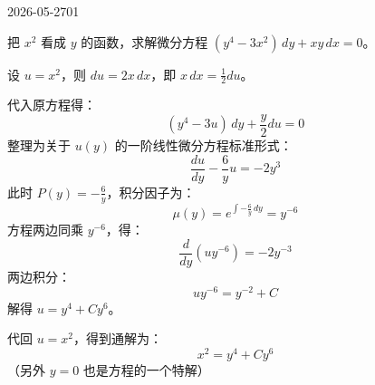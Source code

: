 \begin{mistake}{2026-05-27}{01}

\begin{problemcontent}
把 \(x^2\) 看成 \(y\) 的函数，求解微分方程 \((y^4-3x^2)\,dy+xy\,dx=0\)。
\end{problemcontent}

\begin{solutioncontent}
设 \(u=x^2\)，则 \(du=2x\,dx\)，即 \(x\,dx=\frac{1}{2}du\)。

代入原方程得：
\[
(y^4-3u)\,dy+\frac{y}{2}du=0
\]
整理为关于 \(u(y)\) 的一阶线性微分方程标准形式：
\[
\frac{du}{dy}-\frac{6}{y}u=-2y^3
\]
此时 \(P(y)=-\frac{6}{y}\)，积分因子为：
\[
\mu(y)=e^{\int -\frac{6}{y}\,dy}=y^{-6}
\]
方程两边同乘 \(y^{-6}\)，得：
\[
\frac{d}{dy}(uy^{-6})=-2y^{-3}
\]
两边积分：
\[
uy^{-6}=y^{-2}+C
\]
解得 \(u=y^4+Cy^6\)。

代回 \(u=x^2\)，得到通解为：
\[
x^2=y^4+Cy^6
\]
（另外 \(y=0\) 也是方程的一个特解）
\end{solutioncontent}


\end{mistake}

